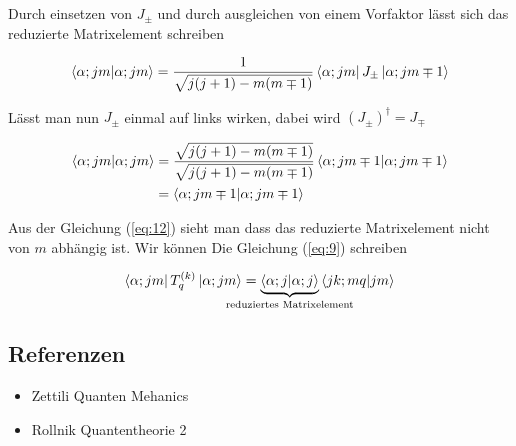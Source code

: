Durch einsetzen von \(J_{\pm}\) und durch ausgleichen von einem Vorfaktor lässt sich das reduzierte Matrixelement schreiben


\begin{align}
  \label{eq:10}
  \braket{\alpha;jm}{\alpha; jm} = \frac{1}{\sqrt{j(j+1)-m(m\mp 1)}}  \bra{\alpha;jm}J_{\pm} \ket{\alpha; jm\mp 1}
\end{align}

Lässt man nun \(J_{\pm}\) einmal auf links wirken, dabei wird \((J_{\pm})^\dagger = J_{\mp}\)

\begin{align}
  \label{eq:12}
  \braket{\alpha;jm}{\alpha; jm} &= \frac{\sqrt{j(j+1)-m(m\mp 1)}}{\sqrt{j(j+1)-m(m\mp 1)}}  \braket{\alpha;jm\mp 1 }{\alpha; jm\mp 1} \notag \\
&= \braket{\alpha;jm\mp 1 }{\alpha; jm\mp 1}
\end{align}

Aus der Gleichung (\ref{eq:12}) sieht man dass das reduzierte Matrixelement nicht von \(m\) abhängig ist. Wir können Die Gleichung (\ref{eq:9}) schreiben

\begin{equation}
  \label{eq:14}
   \bra{\alpha;jm} T^{(k)}_q  \ket{\alpha;jm} =  \underbr{\braket{\alpha;j}{\alpha; j}}_{\text{reduziertes Matrixelement}}   \braket{jk;mq}{jm}
\end{equation}





\subsection*{Referenzen}
\begin{itemize}
\item Zettili Quanten Mehanics
\item Rollnik Quantentheorie 2
\end{itemize}


